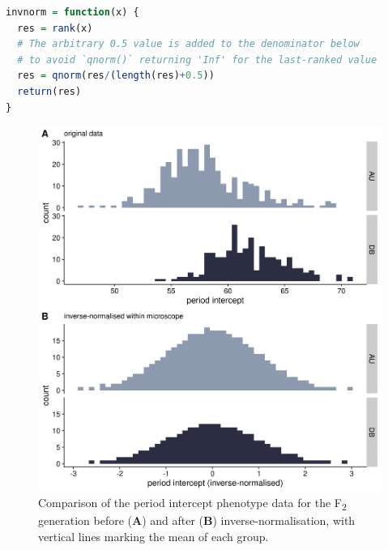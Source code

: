 \documentclass[
]{book}
\begin{document}
\lstset{style=mystyle}
\begin{lstlisting}[language=R, caption=Inverse-normalisation function ]
invnorm = function(x) {
  res = rank(x)
  # The arbitrary 0.5 value is added to the denominator below 
  # to avoid `qnorm()` returning 'Inf' for the last-ranked value
  res = qnorm(res/(length(res)+0.5))
  return(res)
}
\end{lstlisting}



\begin{figure}
\includegraphics[width=1\linewidth]{figs/somites/invnorm_intercept} \caption{Comparison of the period intercept phenotype data for the F\textsubscript{2} generation before (\textbf{A}) and after (\textbf{B}) inverse-normalisation, with vertical lines marking the mean of each group.}\label{fig:invnorm-intercept}
\end{figure}
\end{document}
